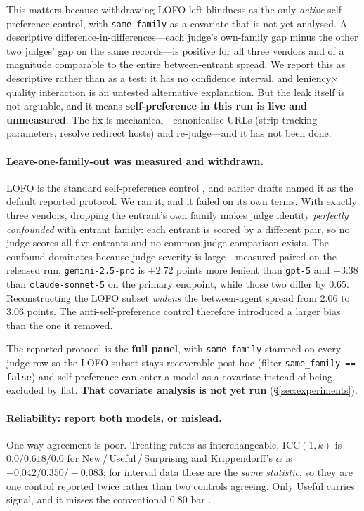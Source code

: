 This matters because withdrawing LOFO left blindness as the only \emph{active} self-preference control, with \texttt{same\_family} as a covariate that is not yet analysed. A descriptive difference-in-differences---each judge's own-family gap minus the other two judges' gap on the same records---is positive for all three vendors and of a magnitude comparable to the entire between-entrant spread. We report this as descriptive rather than as a test: it has no confidence interval, and leniency${\times}$quality interaction is an untested alternative explanation. But the leak itself is not arguable, and it means \textbf{self-preference in this run is live and unmeasured}. The fix is mechanical---canonicalise URLs (strip tracking parameters, resolve redirect hosts) and re-judge---and it has not been done.

\paragraph{Leave-one-family-out was measured and withdrawn.} LOFO is the standard self-preference control \citep{panickssery2024own,ye2024justice}, and earlier drafts named it as the default reported protocol. We ran it, and it failed on its own terms. With exactly three vendors, dropping the entrant's own family makes judge identity \emph{perfectly confounded} with entrant family: each entrant is scored by a different pair, so no judge scores all five entrants and no common-judge comparison exists. The confound dominates because judge severity is large---measured paired on the released run, \texttt{gemini-2.5-pro} is $+2.72$ points more lenient than \texttt{gpt-5} and $+3.38$ than \texttt{claude-sonnet-5} on the primary endpoint, while those two differ by $0.65$. Reconstructing the LOFO subset \emph{widens} the between-agent spread from $2.06$ to $3.06$ points. The anti-self-preference control therefore introduced a larger bias than the one it removed.

The reported protocol is the \textbf{full panel}, with \texttt{same\_family} stamped on every judge row so the LOFO subset stays recoverable post hoc (filter \texttt{same\_family == false}) and self-preference can enter a model as a covariate instead of being excluded by fiat. \textbf{That covariate analysis is not yet run} (\S\ref{sec:experiments}).

\paragraph{Reliability: report both models, or mislead.} One-way agreement is poor. Treating raters as interchangeable, $\mathrm{ICC}(1,k)$ is $0.0 / 0.618 / 0.0$ for New\,/\,Useful\,/\,Surprising and Krippendorff's $\alpha$ is $-0.042 / 0.350 / -0.083$; for interval data these are the \emph{same statistic}, so they are one control reported twice rather than two controls agreeing. Only Useful carries signal, and it misses the conventional $0.80$ bar \citep{hayes2007alpha,koo2016icc}.

